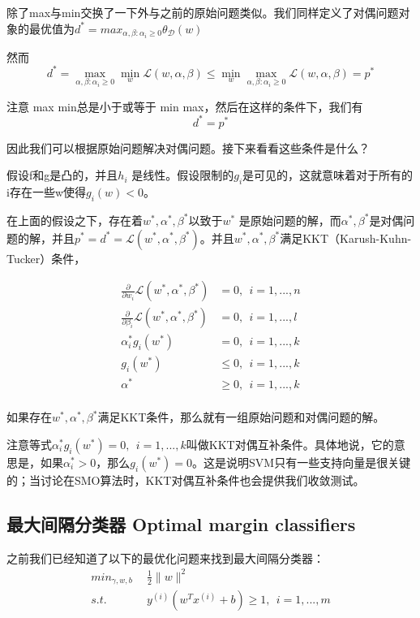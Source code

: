 \documentclass[UTF8]{ctexart}
\begin{document}
除了max与min交换了一下外与之前的原始问题类似。我们同样定义了对偶问题对象的最优值为$d^{*} = max_{\alpha,\beta:\alpha_{i}\geq0} \theta_{\mathcal{D}}(w)$

然而\[ d^{*} = \mathop{max}\limits_{\alpha,\beta:\alpha_{i}\geq 0} \mathop{min}\limits_{w} \mathcal{L}(w,\alpha,\beta) \leq \mathop{min}\limits_{w} \mathop{max}\limits_{\alpha,\beta:\alpha_{i}\geq 0} \mathcal{L}(w,\alpha,\beta)  = p^{*}  \]

注意 max min总是小于或等于 min max，然后在这样的条件下，我们有 \[d^{*} = p^{*}\]

因此我们可以根据原始问题解决对偶问题。接下来看看这些条件是什么？


假设f和g是凸的，并且$h_{i}$ 是线性。假设限制的$g_{i}$是可见的，这就意味着对于所有的i存在一些w使得$g_{i}(w)<0$。


在上面的假设之下，存在着$w^{*},\alpha^{*},\beta^{*}$以致于$w^{*}$ 是原始问题的解，而$\alpha^{*},\beta^{*}$是对偶问题的解，并且$p^{*}=d^{*}=\mathcal{L}(w^{*},\alpha^{*},\beta^{*})$。并且$w^{*},\alpha^{*},\beta^{*}$满足KKT（Karush-Kuhn-Tucker）条件，

\begin{align*}
\frac{\partial{}}{\partial{w_{i}}}  \mathcal{L}(w^{*},\alpha^{*},\beta^{*}) & = 0,\ \ i=1,...,n\\
\frac{\partial{}}{\partial{\beta_{i}}}  \mathcal{L}(w^{*},\alpha^{*},\beta^{*}) & = 0,\ \ i=1,...,l\\
\alpha_{i}^{*}g_{i}(w^{*}) & = 0,\ \ i=1,...,k\\
g_{i}(w^{*}) & \leq 0,\ \ i=1,...,k\\
\alpha^{*} & \geq 0,\ \ i=1,...,k\\
\end{align*}

如果存在$w^{*},\alpha^{*},\beta^{*}$满足KKT条件，那么就有一组原始问题和对偶问题的解。

注意等式$\alpha_{i}^{*}g_{i}(w^{*}) = 0,\ \ i=1,...,k$叫做KKT对偶互补条件。具体地说，它的意思是，如果$\alpha_{i}^{*} >0 $，那么$g_{i}(w^{*})=0$。这是说明SVM只有一些支持向量是很关键的；当讨论在SMO算法时，KKT对偶互补条件也会提供我们收敛测试。



\subsection{最大间隔分类器 Optimal margin classifiers}

之前我们已经知道了以下的最优化问题来找到最大间隔分类器：
\begin{align*}
min_{\gamma,w,b} & \ \ \frac{1}{2}\|  w  \|^{2} \\
s.t. & \ \ y^{(i)}(w^{T}x^{(i)}+b) \geq 1,\ \ i=1,...,m
\end{align*}
\end{document}
